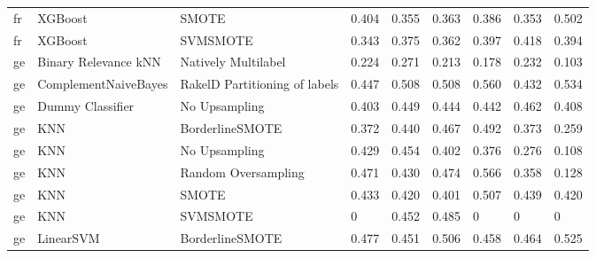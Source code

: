 \begin{tabular}{lllllllll}
      fr &                         XGBoost &                         SMOTE & 0.404 &                     0.355 &                 0.363 &                  0.386 &                                   0.353 &     0.502 \\
      fr &                         XGBoost &                      SVMSMOTE & 0.343 &                     0.375 &                 0.362 &                  0.397 &                                   0.418 &     0.394 \\
      ge &            Binary Relevance kNN &           Natively Multilabel & 0.224 &                     0.271 &                 0.213 &                  0.178 &                                   0.232 &     0.103 \\
      ge &            ComplementNaiveBayes & RakelD Partitioning of labels & 0.447 &                     0.508 &                 0.508 &                  0.560 &                                   0.432 &     0.534 \\
      ge &                Dummy Classifier &                 No Upsampling & 0.403 &                     0.449 &                 0.444 &                  0.442 &                                   0.462 &     0.408 \\
      ge &                             KNN &               BorderlineSMOTE & 0.372 &                     0.440 &                 0.467 &                  0.492 &                                   0.373 &     0.259 \\
      ge &                             KNN &                 No Upsampling & 0.429 &                     0.454 &                 0.402 &                  0.376 &                                   0.276 &     0.108 \\
      ge &                             KNN &           Random Oversampling & 0.471 &                     0.430 &                 0.474 &                  0.566 &                                   0.358 &     0.128 \\
      ge &                             KNN &                         SMOTE & 0.433 &                     0.420 &                 0.401 &                  0.507 &                                   0.439 &     0.420 \\
      ge &                             KNN &                      SVMSMOTE &     0 &                     0.452 &                 0.485 &                      0 &                                       0 &         0 \\
      ge &                       LinearSVM &               BorderlineSMOTE & 0.477 &                     0.451 &                 0.506 &                  0.458 &                                   0.464 &     0.525 \\

\end{tabular}
